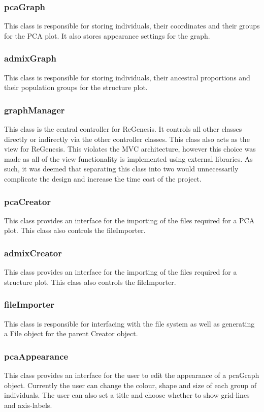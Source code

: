 \documentclass[11pt]{article}
\begin{document}
\subsubsection{pcaGraph}

This class is responsible for storing individuals, their coordinates and their groups for the PCA plot. It also stores appearance settings for the graph. 

\subsubsection{admixGraph}

This class is responsible for storing individuals, their ancestral proportions and their population groups for the structure plot.

\subsubsection{graphManager}
This class is the central controller for ReGenesis. It controls all other classes directly or indirectly via the other controller classes. This class also acts as the view for ReGenesis. This violates the MVC architecture, however this choice was made as all of the view functionality is implemented using external libraries. As such, it was deemed that separating this class into two would unnecessarily complicate the design and increase the time cost of the project.

\subsubsection{pcaCreator}
This class provides an interface for the importing of the files required for a PCA plot. This class also controls the fileImporter.

\subsubsection{admixCreator}
This class provides an interface for the importing of the files required for a structure plot. This class also controls the fileImporter.

\subsubsection{fileImporter}
This class is responsible for interfacing with the file system as well as generating a File object for the parent Creator object.

\subsubsection{pcaAppearance}

This class provides an interface for the user to edit the appearance of a pcaGraph object. Currently the user can change the colour, shape and size of each group of individuals. The user can also set a title and choose whether to show grid-lines and axis-labels.
\end{document}
